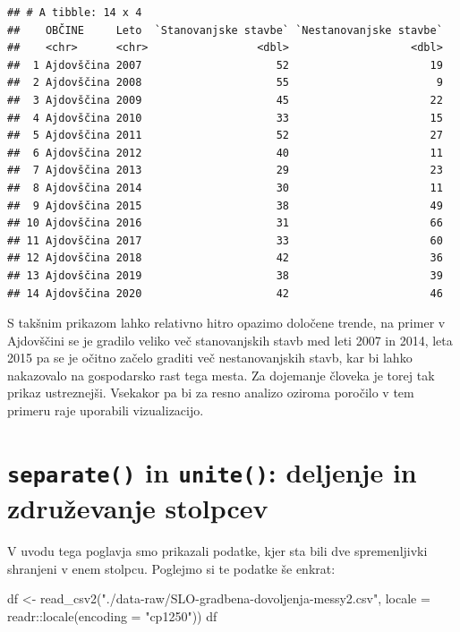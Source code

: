 \documentclass[
]{book}
\newenvironment{Shaded}{\begin{snugshade}}{\end{snugshade}}
\newcommand{\AttributeTok}[1]{\textcolor[rgb]{0.77,0.63,0.00}{#1}}
\newcommand{\FunctionTok}[1]{\textcolor[rgb]{0.00,0.00,0.00}{#1}}
\newcommand{\NormalTok}[1]{#1}
\newcommand{\OtherTok}[1]{\textcolor[rgb]{0.56,0.35,0.01}{#1}}
\newcommand{\SpecialCharTok}[1]{\textcolor[rgb]{0.00,0.00,0.00}{#1}}
\newcommand{\StringTok}[1]{\textcolor[rgb]{0.31,0.60,0.02}{#1}}
\begin{document}
\begin{verbatim}
## # A tibble: 14 x 4
##    OBČINE     Leto  `Stanovanjske stavbe` `Nestanovanjske stavbe`
##    <chr>      <chr>                 <dbl>                   <dbl>
##  1 Ajdovščina 2007                     52                      19
##  2 Ajdovščina 2008                     55                       9
##  3 Ajdovščina 2009                     45                      22
##  4 Ajdovščina 2010                     33                      15
##  5 Ajdovščina 2011                     52                      27
##  6 Ajdovščina 2012                     40                      11
##  7 Ajdovščina 2013                     29                      23
##  8 Ajdovščina 2014                     30                      11
##  9 Ajdovščina 2015                     38                      49
## 10 Ajdovščina 2016                     31                      66
## 11 Ajdovščina 2017                     33                      60
## 12 Ajdovščina 2018                     42                      36
## 13 Ajdovščina 2019                     38                      39
## 14 Ajdovščina 2020                     42                      46
\end{verbatim}

S takšnim prikazom lahko relativno hitro opazimo določene trende, na primer v Ajdovščini se je gradilo veliko več stanovanjskih stavb med leti 2007 in 2014, leta 2015 pa se je očitno začelo graditi več nestanovanjskih stavb, kar bi lahko nakazovalo na gospodarsko rast tega mesta. Za dojemanje človeka je torej tak prikaz ustreznejši. Vsekakor pa bi za resno analizo oziroma poročilo v tem primeru raje uporabili vizualizacijo.

\hypertarget{separate-in-unite-deljenje-in-zdruux17eevanje-stolpcev}{%
\section{\texorpdfstring{\texttt{separate()} in \texttt{unite()}: deljenje in združevanje stolpcev}{separate() in unite(): deljenje in združevanje stolpcev}}\label{separate-in-unite-deljenje-in-zdruux17eevanje-stolpcev}}

V uvodu tega poglavja smo prikazali podatke, kjer sta bili dve spremenljivki shranjeni v enem stolpcu. Poglejmo si te podatke še enkrat:

\begin{Shaded}
\begin{Highlighting}[]
\NormalTok{df }\OtherTok{\textless{}{-}} \FunctionTok{read\_csv2}\NormalTok{(}\StringTok{"./data{-}raw/SLO{-}gradbena{-}dovoljenja{-}messy2.csv"}\NormalTok{,}
                \AttributeTok{locale =}\NormalTok{ readr}\SpecialCharTok{::}\FunctionTok{locale}\NormalTok{(}\AttributeTok{encoding =} \StringTok{"cp1250"}\NormalTok{))}
\NormalTok{df}
\end{Highlighting}
\end{Shaded}
\end{document}
